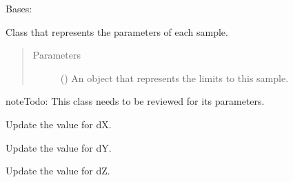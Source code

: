 \documentclass[a4paper,10pt,english]{sphinxmanual}
\begin{document}
\begin{fulllineitems}
\label{\detokenize{autodoc/mrsprint/mrsprint.subject:mrsprint.subject.sample.Sample}}
Bases: 

Class that represents the parameters of each sample.
\begin{quote}\begin{description}
\item[{Parameters}] \leavevmode
{} ({\hyperref[\detokenize{autodoc/mrsprint/mrsprint.subject:mrsprint.subject.sample.SampleConfig}]{}}) \textendash{} An object that represents the limits to this sample.

\end{description}\end{quote}

\begin{sphinxadmonition}{note}{\label{autodoc/mrsprint/mrsprint.subject:index-0}Todo:}
This class needs to be reviewed for its parameters.
\end{sphinxadmonition}

\begin{fulllineitems}
\label{\detokenize{autodoc/mrsprint/mrsprint.subject:mrsprint.subject.sample.Sample.dXUpdate}}
Update the value for dX.

\end{fulllineitems}


\begin{fulllineitems}
\label{\detokenize{autodoc/mrsprint/mrsprint.subject:mrsprint.subject.sample.Sample.dYUpdate}}
Update the value for dY.

\end{fulllineitems}


\begin{fulllineitems}
\label{\detokenize{autodoc/mrsprint/mrsprint.subject:mrsprint.subject.sample.Sample.dZUpdate}}
Update the value for dZ.

\end{fulllineitems}


\end{fulllineitems}
\end{document}
